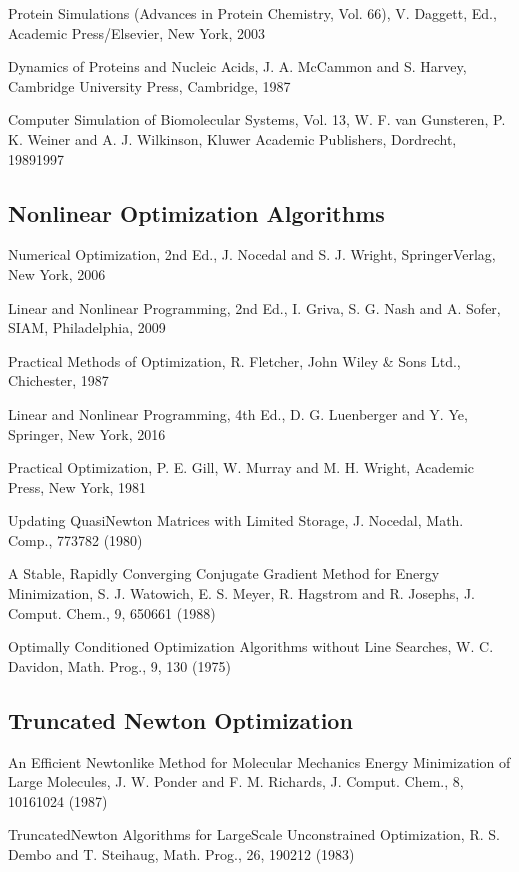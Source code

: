 \documentclass[letterpaper,11pt,english]{sphinxmanual}
\begin{document}
Protein Simulations (Advances in Protein Chemistry, Vol. 66), V. Daggett, Ed., Academic Press/Elsevier, New York, 2003

Dynamics of Proteins and Nucleic Acids, J. A. McCammon and S. Harvey, Cambridge University Press, Cambridge, 1987

Computer Simulation of Biomolecular Systems, Vol. 1\sphinxhyphen{}3, W. F. van Gunsteren, P. K. Weiner and A. J. Wilkinson, Kluwer Academic Publishers, Dordrecht, 1989\sphinxhyphen{}1997


\subsection{Nonlinear Optimization Algorithms}
\label{\detokenize{text/references:nonlinear-optimization-algorithms}}
Numerical Optimization, 2nd Ed., J. Nocedal and S. J. Wright, Springer\sphinxhyphen{}Verlag, New York, 2006

Linear and Nonlinear Programming, 2nd Ed., I. Griva, S. G. Nash and A. Sofer, SIAM, Philadelphia, 2009

Practical Methods of Optimization, R. Fletcher, John Wiley \& Sons Ltd., Chichester, 1987

Linear and Nonlinear Programming, 4th Ed., D. G. Luenberger and Y. Ye, Springer, New York, 2016

Practical Optimization, P. E. Gill, W. Murray and M. H. Wright, Academic Press, New York, 1981

Updating Quasi\sphinxhyphen{}Newton Matrices with Limited Storage, J. Nocedal, Math. Comp., 773\sphinxhyphen{}782 (1980)

A Stable, Rapidly Converging Conjugate Gradient Method for Energy Minimization, S. J. Watowich, E. S. Meyer, R. Hagstrom and R. Josephs, J. Comput. Chem., 9, 650\sphinxhyphen{}661 (1988)

Optimally Conditioned Optimization Algorithms without Line Searches, W. C. Davidon, Math. Prog., 9, 1\sphinxhyphen{}30 (1975)


\subsection{Truncated Newton Optimization}
\label{\detokenize{text/references:truncated-newton-optimization}}
An Efficient Newton\sphinxhyphen{}like Method for Molecular Mechanics Energy Minimization of Large Molecules, J. W. Ponder and F. M. Richards, J. Comput. Chem., 8, 1016\sphinxhyphen{}1024 (1987)

Truncated\sphinxhyphen{}Newton Algorithms for Large\sphinxhyphen{}Scale Unconstrained Optimization, R. S. Dembo and T. Steihaug, Math. Prog., 26, 190\sphinxhyphen{}212 (1983)
\end{document}
